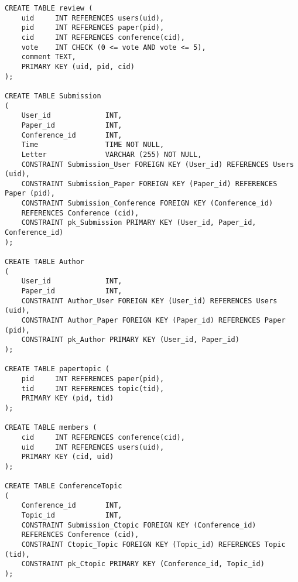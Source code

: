 \documentclass[12pt]{article}
\newcommand{\<}{\langle}
\renewcommand{\>}{\rangle}
\begin{document}
\begin{verbatim}
CREATE TABLE review (
    uid     INT REFERENCES users(uid),
    pid     INT REFERENCES paper(pid),
    cid     INT REFERENCES conference(cid),
    vote    INT CHECK (0 <= vote AND vote <= 5),
    comment TEXT,
    PRIMARY KEY (uid, pid, cid)
);

CREATE TABLE Submission
(
    User_id             INT,
    Paper_id            INT,
    Conference_id       INT,
    Time                TIME NOT NULL,
    Letter              VARCHAR (255) NOT NULL,
    CONSTRAINT Submission_User FOREIGN KEY (User_id) REFERENCES Users (uid),
    CONSTRAINT Submission_Paper FOREIGN KEY (Paper_id) REFERENCES Paper (pid),
    CONSTRAINT Submission_Conference FOREIGN KEY (Conference_id) 
    REFERENCES Conference (cid),
    CONSTRAINT pk_Submission PRIMARY KEY (User_id, Paper_id, Conference_id)
);

CREATE TABLE Author
(
    User_id             INT,
    Paper_id            INT,
    CONSTRAINT Author_User FOREIGN KEY (User_id) REFERENCES Users (uid),
    CONSTRAINT Author_Paper FOREIGN KEY (Paper_id) REFERENCES Paper (pid),
    CONSTRAINT pk_Author PRIMARY KEY (User_id, Paper_id)
);

CREATE TABLE papertopic (
    pid     INT REFERENCES paper(pid),
    tid     INT REFERENCES topic(tid),
    PRIMARY KEY (pid, tid)
);

CREATE TABLE members (
    cid     INT REFERENCES conference(cid),
    uid     INT REFERENCES users(uid),
    PRIMARY KEY (cid, uid)
);

CREATE TABLE ConferenceTopic
(
    Conference_id       INT,
    Topic_id            INT,
    CONSTRAINT Submission_Ctopic FOREIGN KEY (Conference_id)
    REFERENCES Conference (cid),
    CONSTRAINT Ctopic_Topic FOREIGN KEY (Topic_id) REFERENCES Topic (tid),
    CONSTRAINT pk_Ctopic PRIMARY KEY (Conference_id, Topic_id)
);
\end{verbatim}
\end{document}
